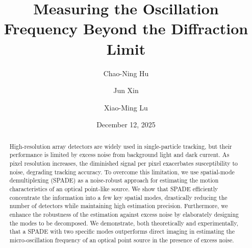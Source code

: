 \documentclass[aps,pra,10pt,showpacs,amsmath,amssymb,floatfix,superscriptaddress,twocolumn]{revtex4-2}
\begin{document}
\title{Measuring the Oscillation Frequency Beyond the Diffraction Limit}
\author{Chao-Ning Hu}
\author{Jun Xin}
\author{Xiao-Ming Lu}
\date{December 12, 2025}

\begin{abstract} 
High-resolution array detectors are widely used in single-particle tracking, but their performance is limited by excess noise from background light and dark current.
As pixel resolution increases, the diminished signal per pixel exacerbates susceptibility to noise, degrading tracking accuracy.
To overcome this limitation, we use spatial-mode demultiplexing (SPADE) as a noise-robust approach for estimating the motion characteristics of an optical point-like source.
We show that SPADE efficiently concentrate the information into a few key spatial modes, drastically reducing the number of detectors while maintaining high estimation precision. 
Furthermore, we enhance the robustness of the estimation against excess noise by elaborately designing the modes to be decomposed. 
We demonstrate, both theoretically and experimentally, that a SPADE with two specific modes outperforms direct imaging in estimating the micro-oscillation frequency of an optical point source in the presence of excess noise.
\end{abstract}
\maketitle
\end{document}

